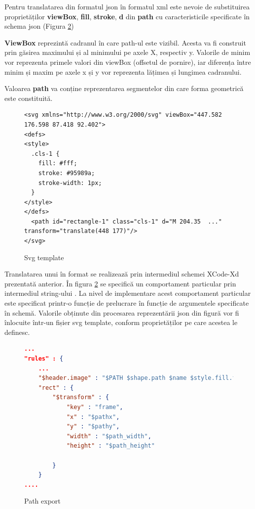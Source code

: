 Pentru translatarea din formatul json în formatul xml este nevoie de substituirea proprietăților \textbf{viewBox}, \textbf{fill}, \textbf{stroke}, \textbf{d} din \textbf{path} cu caracteristicile specificate în schema json (Figura \ref{fig:PathExport})


\textbf{ViewBox} reprezintă cadranul în care path-ul este vizibil. Acesta va fi construit prin găsirea maximului și al minimului pe axele X, respectiv y. Valorile de minim vor reprezenta primele valori din viewBox (offsetul de pornire), iar diferența între minim și maxim pe axele x și y vor reprezenta lățimea și lungimea cadranului.

Valoarea \textbf{path} va conține reprezentarea segmentelor din care forma geometrică este constituită.

\begin{figure}
\lstset{language=XML}
\begin{lstlisting}
<svg xmlns="http://www.w3.org/2000/svg" viewBox="447.582 176.598 87.418 92.402">
<defs>
<style>
  .cls-1 {
    fill: #fff;
    stroke: #95989a;
    stroke-width: 1px;
  }
</style>
</defs>
  <path id="rectangle-1" class="cls-1" d="M 204.35  ..." transform="translate(448 177)"/>
</svg>
\end{lstlisting}
\caption{Svg template}\label{fig:svg}
\end{figure}

Translatarea unui  în format  se realizează prin intermediul schemei XCode-Xd prezentată anterior. În figura \ref{fig:PathExport} se specifică un comportament particular prin intermediul string-ului . La nivel de implementare acest comportament particular este specificat printr-o funcție de prelucrare în funcție de argumentele specificate în schemă. Valorile obținute din procesarea reprezentării json din figură vor fi înlocuite într-un fișier svg template, conform proprietăților pe care acestea le definesc. 

\begin{figure}[!htbp]
\begin{lstlisting}[language=json,firstnumber=1]
...
"rules" : {
    ...
    "$header.image" : "$PATH $shape.path $name $style.fill.type $style.fill.color.value $transform $style.stroke.color.value $style.stroke.width",
    "rect" : {
        "$transform" : {
            "key" : "frame",
            "x" : "$pathx",
            "y" : "$pathy",
            "width" : "$path_width",
            "height" : "$path_height"
                        
        }
    }
....
\end{lstlisting}
\caption{Path export} \label{fig:PathExport}
\end{figure}


